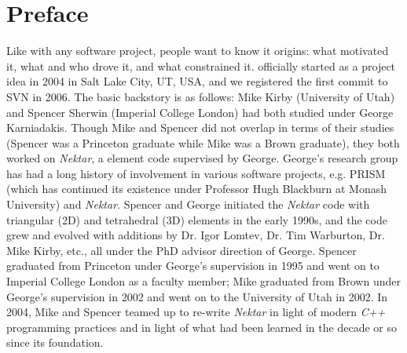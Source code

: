 \chapter{Preface}
 
Like with any software project, people want to know it origins:  what motivated it, what and who drove it, and what
constrained it.  \nek{} officially started as a project idea in 2004 in Salt Lake City, UT, USA, and we registered
the first commit to SVN in 2006.  The basic backstory is as follows:  Mike Kirby (University of Utah) and Spencer
Sherwin (Imperial College London) had both studied under George Karniadakis.  Though Mike and Spencer did
not overlap in terms of their studies (Spencer was a Princeton graduate while Mike was a Brown graduate), they
both worked on \emph{Nektar}, a \shp{} element code supervised by George.  George's research group has
had a long history of involvement in various software projects, e.g. PRISM (which has continued its existence
under Professor Hugh Blackburn at Monash University) and \emph{Nektar}.  
Spencer and George initiated the \emph{Nektar} code with triangular (2D) and
tetrahedral (3D) \shp{} elements in the early 1990s, and the code grew and evolved with additions
by Dr. Igor Lomtev,  Dr. Tim Warburton, Dr. Mike Kirby, etc., all under the PhD advisor direction of George.  Spencer
graduated from Princeton under George's supervision in 1995 and went on to Imperial College London 
as a faculty member; Mike graduated from Brown under George's supervision in 2002 and went on to the
University of Utah in 2002.  In 2004, Mike and Spencer teamed up to re-write \emph{Nektar} in light of modern
{\em C++} programming practices and in light of what had been learned in the decade or so since its foundation.

